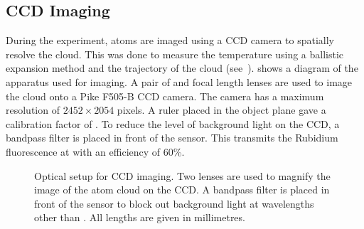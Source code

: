 \subsection{CCD Imaging}\label{sec:imaging}
During the experiment, atoms are imaged using a CCD camera to spatially resolve the cloud. This was done to measure the temperature using a ballistic expansion method and the trajectory of the cloud (see~).  shows a
diagram of the apparatus used for imaging. A pair of 
and  focal length lenses are used to image the cloud
onto a Pike F505-B CCD camera. The camera has a maximum resolution of \(2452 \times
2054\) pixels. A ruler placed in the object plane gave a calibration factor of
. To reduce the level
of background light on the CCD, a bandpass filter is placed in front
of the sensor. This transmits the Rubidium fluorescence at
 with an efficiency of 60\%.
\begin{figure}[!htbp]
	\centering
	\def\svgwidth{0.6\textwidth}
	
	\caption[Optical setup for CCD imaging]{Optical setup for CCD imaging. Two
		lenses are used to magnify the image of the atom cloud on the CCD. A
		bandpass filter is placed in front of the sensor to block out background
		light at wavelengths other than
		. All lengths are given in millimetres.}
	\label{fig:imaging_optics}
\end{figure}

